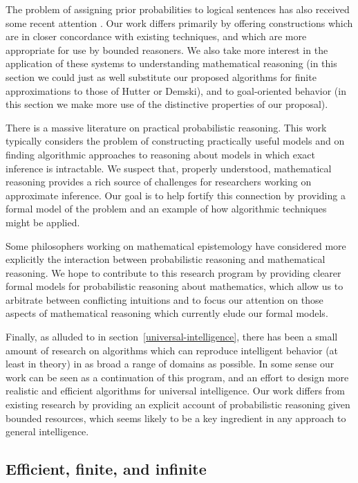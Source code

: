 \documentclass[12pt]{article}
\theoremstyle{definition}
\begin{document}
The problem of assigning prior probabilities to logical sentences has also received
some recent attention \cite{demski12, hutter-prior}.
Our work differs primarily by offering constructions which are in closer
concordance with existing techniques,
and which are more appropriate for use by bounded reasoners.
We also take more interest in the application of these systems
to understanding mathematical reasoning (in this section
we could just as well substitute our proposed algorithms for finite
approximations to those of Hutter or Demski), and to goal-oriented behavior
(in this section we make more use of the distinctive properties of our proposal).

There is a massive literature on practical probabilistic reasoning.
This work typically considers the problem of constructing
practically useful models and on finding algorithmic approaches
to reasoning about models in which exact inference is intractable.
We suspect that, properly understood, mathematical reasoning provides
a rich source of challenges for researchers working on approximate inference.
Our goal is to help fortify this connection by providing a formal
model of the problem and an example of how algorithmic techniques
might be applied.

Some philosophers working on mathematical epistemology
have considered more explicitly the interaction between probabilistic
reasoning and mathematical reasoning. %
We hope to contribute to this research program by providing
clearer formal models for probabilistic reasoning about mathematics,
which allow us to arbitrate between conflicting intuitions
and to focus our attention on those aspects of mathematical reasoning
which currently elude our formal models.

Finally, as alluded to in section~\ref{universal-intelligence},
there has been a small amount of research on algorithms
which can reproduce intelligent behavior (at least in theory)
in as broad a range of domains as possible\cite{godel-machine, aixi}.
In some sense our work can be seen as a continuation of this program,
and an effort to design more realistic and efficient
algorithms for universal intelligence.
Our work differs from existing research by providing an
explicit account of probabilistic reasoning given bounded
resources, which seems likely to be a key ingredient
in any approach to general intelligence.

\subsection{Efficient, finite, and infinite}
\end{document}

